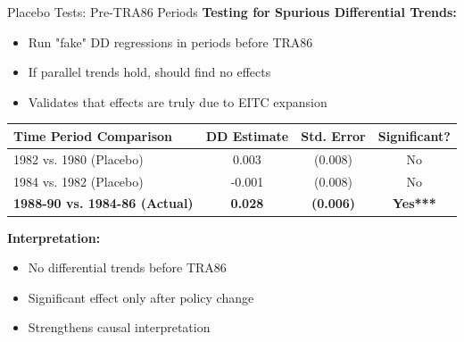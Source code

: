 \documentclass[aspectratio=169]{beamer}
\begin{document}
\begin{frame}{Placebo Tests: Pre-TRA86 Periods}
\textbf{Testing for Spurious Differential Trends:}
\begin{itemize}
    \item Run "fake" DD regressions in periods before TRA86
    \item If parallel trends hold, should find no effects
    \item Validates that effects are truly due to EITC expansion
\end{itemize}

\vspace{0.3cm}
\begin{table}
\centering
\begin{tabular}{lccc}
\toprule
\textbf{Time Period Comparison} & \textbf{DD Estimate} & \textbf{Std. Error} & \textbf{Significant?} \\
\midrule
1982 vs. 1980 (Placebo) & 0.003 & (0.008) & No \\
1984 vs. 1982 (Placebo) & -0.001 & (0.008) & No \\
\addlinespace[0.2cm]
\textbf{1988-90 vs. 1984-86 (Actual)} & \textbf{0.028} & \textbf{(0.006)} & \textbf{Yes***} \\
\bottomrule
\end{tabular}
\end{table}

\vspace{0.3cm}
\textbf{Interpretation:}
\begin{itemize}
    \item No differential trends before TRA86
    \item Significant effect only after policy change
    \item Strengthens causal interpretation
\end{itemize}
\end{frame}
\end{document}
